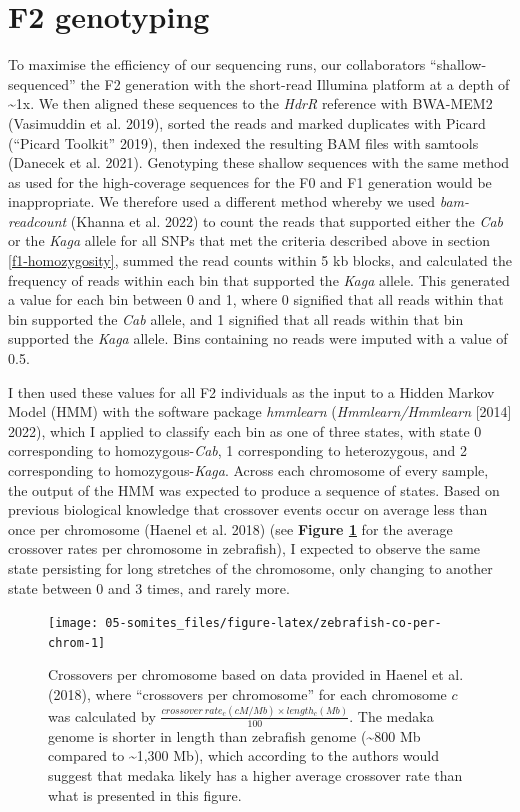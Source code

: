 \documentclass[
]{book}
\begin{document}
\hypertarget{somite-f2-sequencing}{%
\section{F2 genotyping}\label{somite-f2-sequencing}}

To maximise the efficiency of our sequencing runs, our collaborators ``shallow-sequenced'' the F2 generation with the short-read Illumina platform at a depth of \textasciitilde1x. We then aligned these sequences to the \emph{HdrR} reference with BWA-MEM2 (Vasimuddin et al. 2019), sorted the reads and marked duplicates with Picard ({``Picard Toolkit''} 2019), then indexed the resulting BAM files with samtools (Danecek et al. 2021). Genotyping these shallow sequences with the same method as used for the high-coverage sequences for the F0 and F1 generation would be inappropriate. We therefore used a different method whereby we used \emph{bam-readcount} (Khanna et al. 2022) to count the reads that supported either the \emph{Cab} or the \emph{Kaga} allele for all SNPs that met the criteria described above in section \ref{f1-homozygosity}, summed the read counts within 5 kb blocks, and calculated the frequency of reads within each bin that supported the \emph{Kaga} allele. This generated a value for each bin between 0 and 1, where 0 signified that all reads within that bin supported the \emph{Cab} allele, and 1 signified that all reads within that bin supported the \emph{Kaga} allele. Bins containing no reads were imputed with a value of 0.5.

I then used these values for all F2 individuals as the input to a Hidden Markov Model (HMM) with the software package \emph{hmmlearn} (\emph{Hmmlearn/Hmmlearn} {[}2014{]} 2022), which I applied to classify each bin as one of three states, with state 0 corresponding to homozygous-\emph{Cab}, 1 corresponding to heterozygous, and 2 corresponding to homozygous-\emph{Kaga}.
Across each chromosome of every sample, the output of the HMM was expected to produce a sequence of states. Based on previous biological knowledge that crossover events occur on average less than once per chromosome (Haenel et al. 2018) (see \textbf{Figure \ref{fig:zebrafish-co-per-chrom}} for the average crossover rates per chromosome in zebrafish), I expected to observe the same state persisting for long stretches of the chromosome, only changing to another state between 0 and 3 times, and rarely more.



\begin{figure}
\texttt{[image: 05-somites\_files/figure-latex/zebrafish-co-per-chrom-1]} \caption{Crossovers per chromosome based on data provided in Haenel et al. (2018), where ``crossovers per chromosome'' for each chromosome \(c\) was calculated by \(\frac{crossover~rate_{c}(cM / Mb) \times length_{c}(Mb)} {100}\). The medaka genome is shorter in length than zebrafish genome (\textasciitilde800 Mb compared to \textasciitilde1,300 Mb), which according to the authors would suggest that medaka likely has a higher average crossover rate than what is presented in this figure.}\label{fig:zebrafish-co-per-chrom}
\end{figure}
\end{document}
